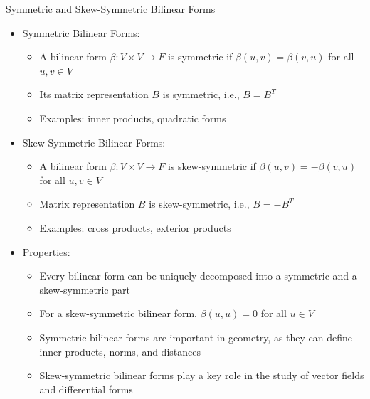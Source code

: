 \documentclass[fullscreen=true, bookmarks=true, hyperref={pdfencoding=unicode}]{beamer}
\begin{document}
\begin{frame}{Symmetric and Skew-Symmetric Bilinear Forms}
  \begin{itemize}
    \item Symmetric Bilinear Forms:
      \begin{itemize}
        \item A bilinear form $\beta: V \times V \rightarrow F$ is symmetric 
        if $\beta(u, v) = \beta(v, u)$ for all $u, v \in V$
        \item Its matrix representation $B$ is symmetric, i.e., $B = B^T$
        \item Examples: inner products, quadratic forms
      \end{itemize}
    \pause\item Skew-Symmetric Bilinear Forms:
      \begin{itemize}
        \item A bilinear form $\beta: V \times V \rightarrow F$ is 
        skew-symmetric if $\beta(u, v) = -\beta(v, u)$ for all $u, v \in V$
        \item Matrix representation $B$ is skew-symmetric, i.e., $B = -B^T$
        \item Examples: cross products, exterior products
      \end{itemize}
    \pause\item Properties:
      \begin{itemize}
        \item Every bilinear form can be uniquely decomposed into a symmetric 
        and a skew-symmetric part
        \item For a skew-symmetric bilinear form, $\beta(u, u) = 0$ 
        for all $u \in V$
        \item Symmetric bilinear forms are important in geometry, as they can 
        define inner products, norms, and distances
        \item Skew-symmetric bilinear forms play a key role in the study of 
        vector fields and differential forms
      \end{itemize}
  \end{itemize}
\end{frame}
\end{document}
